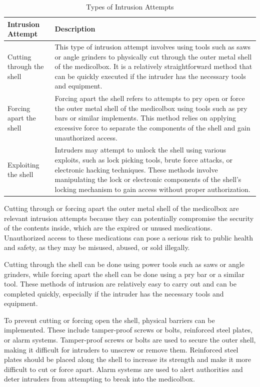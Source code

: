 \documentclass[../main.tex]{subfiles}
\begin{document}
\begin{table}[htbp]
    \centering
    \caption{Types of Intrusion Attempts}
    \label{tab:TypesOfIntrusionAttempts}
    \begin{tabular}{|l|p{10cm}|} \hline
        \textbf{Intrusion Attempt} & \textbf{Description} \\ \hline
        Cutting through the shell & This type of intrusion attempt involves using tools such as saws or angle grinders to physically cut through the outer metal shell of the \gls{medicolbox}. It is a relatively straightforward method that can be quickly executed if the intruder has the necessary tools and equipment. \\ \hline
        Forcing apart the shell & Forcing apart the shell refers to attempts to pry open or force the outer metal shell of the \gls{medicolbox} using tools such as pry bars or similar implements. This method relies on applying excessive force to separate the components of the shell and gain unauthorized access. \\ \hline
        Exploiting the shell & Intruders may attempt to unlock the shell using various exploits, such as lock picking tools, brute force attacks, or electronic hacking techniques. These methods involve manipulating the lock or electronic components of the shell's locking mechanism to gain access without proper authorization. \\ \hline
    \end{tabular}
\end{table}

Cutting through or forcing apart the outer metal shell of
the \gls{medicolbox} are relevant \gls{intrusion} attempts because
they can potentially compromise the security of the contents inside,
which are the expired or unused medications.
Unauthorized access to these medications can pose a
serious risk to public health and safety, as they may be misused,
abused, or sold illegally.

Cutting through the shell can be done using power tools such as
saws or angle grinders, while forcing apart the shell
can be done using a pry bar or a similar tool.
These methods of \gls{intrusion} are relatively easy to carry out
and can be completed quickly,
especially if the intruder has the necessary tools and equipment.

To prevent cutting or forcing open the shell,
physical barriers can be implemented.
These include tamper-proof screws or bolts,
reinforced steel plates, or alarm systems.
Tamper-proof screws or bolts are used to secure the outer shell,
making it difficult for intruders to unscrew or remove them.
Reinforced steel plates should be placed along the shell to
increase its strength and make it more difficult to cut or force apart.
Alarm systems are used to alert authorities and deter
intruders from attempting to break into the \gls{medicolbox}.
\end{document}
